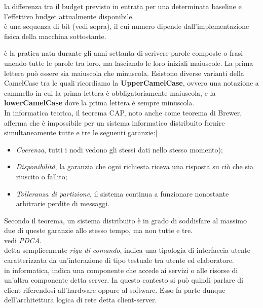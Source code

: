 \documentclass{scalatekids-article}
\begin{document}
 la differenza tra il budget previsto in entrata per una determinata baseline e l'effettivo budget attualmente disponibile.
\\

 è una sequenza di bit (vedi sopra), il cui numero dipende dall'implementazione fisica della macchina sottostante.
\\


 è la pratica nata durante gli anni settanta di scrivere parole composte o frasi unendo tutte le parole tra loro, ma lasciando le loro iniziali maiuscole. La prima lettera può essere sia maiuscola che minuscola.
Esistono diverse varianti della CamelCase tra le quali ricordiamo la \textbf{UpperCamelCase}, ovvero una notazione a cammello in cui la prima lettera è obbligatoriamente maiuscola, e la \textbf{lowerCamelCase} dove la prima lettera è sempre minuscola.
\\

 In informatica teorica, il teorema CAP, noto anche come teorema di Brewer, afferma che è impossibile per un sistema informatico distribuito fornire simultaneamente tutte e tre le seguenti garanzie:[
\begin{itemize}
	\item \textit{Coerenza}, tutti i nodi vedono gli stessi dati nello stesso momento);
	\item \textit{Disponibilità}, la garanzia che ogni richiesta riceva una risposta su ciò che sia riuscito o fallito;
	\item \textit{Tolleranza di partizione}, il sistema continua a funzionare nonostante arbitrarie perdite di messaggi.
\end{itemize}
Secondo il teorema, un sistema distribuito è in grado di soddisfare al massimo due di queste garanzie allo stesso tempo, ma non tutte e tre.
\\

 vedi \textit{PDCA}.
\\

 detta semplicemente \textit{riga di comando}, indica una tipologia di interfaccia utente caratterizzata da un'interazione di tipo testuale tra utente ed elaboratore.
\\

 in informatica, indica una componente che accede ai servizi o alle risorse di un'altra componente detta server. In questo contesto si può quindi parlare di client riferendosi all'hardware oppure al software. Esso fa parte dunque dell'architettura logica di rete detta client-server.
\\
\end{document}
